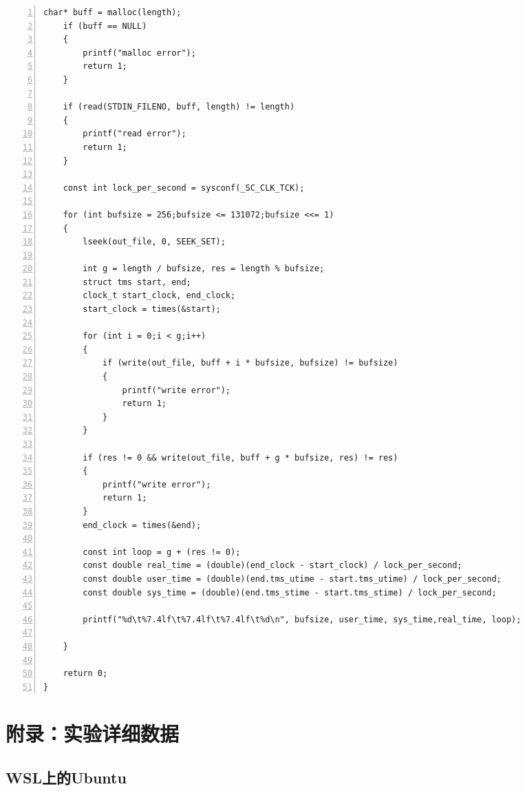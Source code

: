 \documentclass[a4paper,twoside]{article}
\begin{document}
\begin{spacing}{1.2}
\begin{lstlisting}[numbers=left,style=CppStyle,caption=程序实现,label={code:impl}]
    char* buff = malloc(length);
    if (buff == NULL)
    {
        printf("malloc error");
        return 1;
    }

    if (read(STDIN_FILENO, buff, length) != length)
    {
        printf("read error");
        return 1;
    }

    const int lock_per_second = sysconf(_SC_CLK_TCK);

    for (int bufsize = 256;bufsize <= 131072;bufsize <<= 1)
    {
        lseek(out_file, 0, SEEK_SET);

        int g = length / bufsize, res = length % bufsize;
        struct tms start, end;
        clock_t start_clock, end_clock;
        start_clock = times(&start);
        
        for (int i = 0;i < g;i++)
        {
            if (write(out_file, buff + i * bufsize, bufsize) != bufsize)
            {
                printf("write error");
                return 1;
            }
        }

        if (res != 0 && write(out_file, buff + g * bufsize, res) != res)
        {
            printf("write error");
            return 1;
        }
        end_clock = times(&end);

        const int loop = g + (res != 0);
        const double real_time = (double)(end_clock - start_clock) / lock_per_second;
        const double user_time = (double)(end.tms_utime - start.tms_utime) / lock_per_second;
        const double sys_time = (double)(end.tms_stime - start.tms_stime) / lock_per_second;

        printf("%d\t%7.4lf\t%7.4lf\t%7.4lf\t%d\n", bufsize, user_time, sys_time,real_time, loop);

    }

    return 0;
}
\end{lstlisting}

\clearpage
\section*{附录：实验详细数据}
\label{sec:appendix}

\subsection{WSL上的Ubuntu}


\end{spacing}
\end{document}
